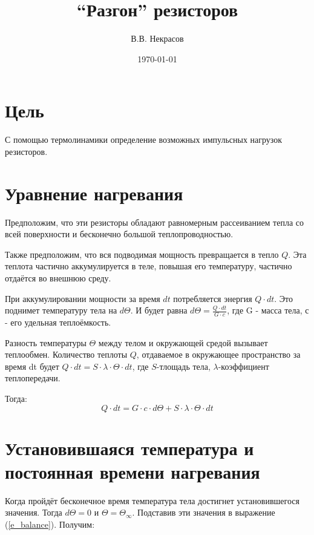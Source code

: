 \documentclass[a4paper]{article}
\begin{document}
\title{``Разгон'' резисторов}
\author{В.В. Некрасов}
\date{\today}
\maketitle

\section{Цель}

    С помощью термолинамики определение возможных импульсных нагрузок резисторов.

\section{Уравнение нагревания}

    Предположим, что эти резисторы обладают равномерным рассеиванием тепла со всей
поверхности и бесконечно большой теплопроводностью.

    Также предположим, что вся подводимая мощность превращается в тепло $Q$. Эта
теплота частично аккумулируется в теле, повышая его температуру, частично отдаётся
во внешнюю среду.

    При аккумулировании мощности за время $dt$ потребляется энергия $Q{\cdot}dt$. Это
поднимет температуру тела на $d{{\Theta}}$. И будет равна
$d{{\Theta}}=\frac{Q{\cdot}dt}{G{\cdot}c}$, где G - масса тела, с - его удельная теплоёмкость.

    Разность температуры ${\Theta}$ между телом и окружающей средой вызывает
теплообмен. Количество теплоты $Q$, отдаваемое в окружающее пространство за время
dt будет $Q{\cdot}dt=S{\cdot}{\lambda}{\cdot}{\Theta}{\cdot}dt$, где $S$-тлощадь тела, ${\lambda}$-коэффициент
теплопередачи.

    Тогда:
\begin{equation}
\label{e_balance}
Q{\cdot}dt=G{\cdot}c{\cdot}d{\Theta}+S{\cdot}{\lambda}{\cdot}{\Theta}{\cdot}dt
\end{equation}

\section{Установившаяся температура и постоянная времени нагревания}

    Когда пройдёт бесконечное время температура тела достигнет установившегося
значения. Тогда $d{\Theta}=0$ и ${\Theta}={\Theta}_\infty$. Подставив эти значения в
выражение (\ref{e_balance}). Получим:
\end{document}
